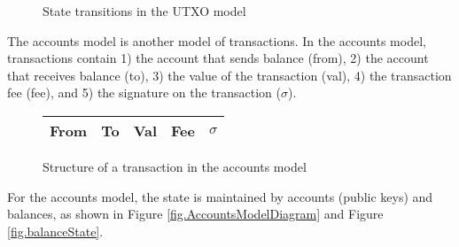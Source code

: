 \begin{figure}[h]
    \centering
    \caption{State transitions in the UTXO model}
    \label{fig.UTXOModelDiagram}
\end{figure}

The accounts model is another model of transactions.
In the accounts model, transactions contain 1) the account that sends balance (from), 2) the account that receives balance (to), 3) the value of the transaction (val), 4) the transaction fee (fee), and 5) the signature on the transaction ($\sigma$).

\begin{figure}[h]
\centering
    \begin{tabular}{|c|c|c|c|c|}
         \hline
         From & To & Val & Fee & {$\sigma$} \\
         \hline
    \end{tabular}
    \label{fig.accountsTx}
    \caption{Structure of a transaction in the accounts model}
\end{figure}

For the accounts model, the state is maintained by accounts (public keys) and balances, as shown in Figure \ref{fig.AccountsModelDiagram} and Figure \ref{fig.balanceState}.

